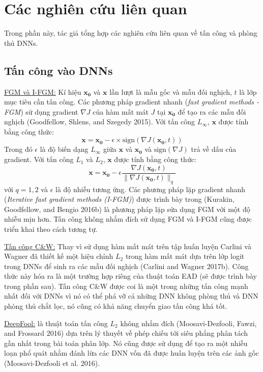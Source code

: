 \chapter{Các nghiên cứu liên quan}
Trong phần này, tác giả tổng hợp các nghiên cứu liên quan về tấn công và phòng thủ DNNs.

\section{Tấn công vào DNNs}
\underline{FGM và I-FGM:} Kí hiệu $\mathbf{x_0}$ và $\mathbf{x}$ lần lượt là mẫu gốc và mẫu đối nghịch,
$t$ là lớp mục tiêu cần tấn công. Các phương pháp gradient nhanh (\textit{fast gradient 
methods - FGM}) sử dụng gradient $\nabla J$ của hàm mất mát $J$ tại $\mathbf{x_0}$
để tạo ra các mẫu đối nghịch (Goodfellow, Shlens, and Szegedy 2015). Với tấn công $L_{\infty}$, 
$\mathbf{x}$ được tính bằng công thức:
\begin{equation}
    \mathbf{x} = \mathbf{x_0} - \epsilon \times \text{sign}(\nabla J(\mathbf{x_0}, t))
    \label{eq:1}
\end{equation}
Trong đó $\epsilon$ là độ biến dạng $L_{\infty}$ giữa $\mathbf{x}$ và $\mathbf{x_0}$ và 
$\text{sign}(\nabla J)$ trả về dấu của gradient. Với tấn công $L_1$ và $L_2$, $\mathbf{x}$ 
được tính bằng công thức:
\begin{equation}
    \mathbf{x} = \mathbf{x_0} - \epsilon \frac{\nabla J(\mathbf{x_0}, t)}
    {\lVert \nabla J(\mathbf{x_0}, t) \rVert _q}
    \label{eq:2}
\end{equation}
với $q = 1,2$ và $\epsilon$ là độ nhiễu tương ứng. Các phương pháp lặp gradient nhanh 
(\textit{Iterative fast gradient methods (I-FGM)}) được trình bày trong (Kurakin, Goodfellow, 
and Bengio 2016b) là phương pháp lặp sửa dụng FGM với một độ nhiễu mịn hơn. Tấn công 
không nhắm đích sử dụng FGM và I-FGM cũng được triển khai theo cách tương tự. 

\underline{Tấn công C\&W:} Thay vì sử dụng hàm mất mát trên tập huấn luyện Carlini và Wagner
đã thiết kế  một hiệu chỉnh $L_2$ trong hàm mất mát dựa trên lớp logit trong DNNs để sinh 
ra các mẫu đối nghịch (Carlini and Wagner 2017b). Công thức này hóa ra là một trường hợp riêng của 
thuật toán EAD (sẽ được trình bày trong phần sau). Tấn công C\&W được coi 
là một trong những tấn công mạnh nhất đối với DNNs vì nó có thể phá vỡ cả những DNN không phòng thủ và DNN phòng thủ chắt lọc, nó cũng có khả năng chuyển giao tấn công khá tốt. 

\underline{DeepFool:} là thuật toán tấn công $L_2$ không nhắm đích (Moosavi-Dezfooli, 
Fawzi, and Frossard 2016) dựa trên lý thuyết về phép chiếu tới siêu phẳng phân tách gần nhất
trong bài toán phân lớp. Nó cũng được sử dụng để tạo ra một nhiễu loạn phổ quát nhằm đánh lừa 
các DNN vốn đã được huấn luyện trên các ảnh gốc (Moosavi-Dezfooli et al. 2016).

